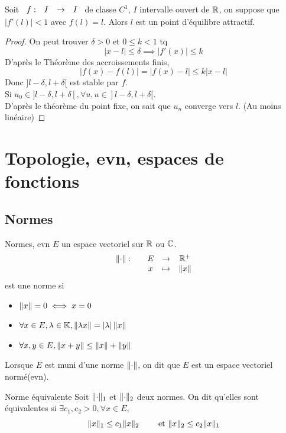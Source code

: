 \documentclass[]{report}
\begin{document}
\begin{prop}{}{}
    Soit $\begin{array}{ccccc} f : & I & \to & I \end{array}$ de classe $C^1$, $I$ intervalle ouvert de $\mathbb{R}$, on suppose que $\left|f'(l)\right|<1$ avec $f(l)=l$. Alors $l$ est un point d'équilibre attractif.
\end{prop}

\begin{proof}{}{}
    On peut trouver $\delta>0$ et $0\le k<1$ tq
    \[|x-l|\le \delta \implies \left|f'(x)\right|\le k\]
    D'après le Théorème des accroissements finis,
    \[\left|f(x)-f(l)\right|=\left|f(x)-l\right|\le k\left|x-l\right|\]
    Donc $]l-\delta,l+\delta[$ est stable par $f$.\\
    Si $u_0\in ]l-\delta,l+\delta[,\forall u,u\in ]l-\delta,l+\delta[$.\\
    D'après le théorème du point fixe, on sait que $u_n$ converge vers $l$. (Au moins linéaire)
\end{proof}

\chapter{Topologie, evn, espaces de fonctions}

\section{Normes}

\begin{df}{Normes, evn}{}
    $E$ un espace vectoriel sur $\mathbb{R}$ ou $\mathbb{C}$.
    \[\begin{array}{ccccc} \lVert \cdot \rVert : & & E & \to & \mathbb{R}^+ \\ & & x & \mapsto & \lVert x \rVert \end{array}\]
    est une norme si
    \begin{itemize}
        \item $\lVert x \rVert=0\iff x=0$
        \item $\forall x\in E, \lambda\in \mathbb{K},\lVert \lambda x \rVert=\left|\lambda\right|\lVert x \rVert$
        \item $\forall x,y\in E,\lVert x+y \rVert\le \lVert x \rVert+\lVert y \rVert$
    \end{itemize}
    Lorsque $E$ est muni d'une norme $\lVert \cdot \rVert$, on dit que $E$ est un espace vectoriel normé(evn).
\end{df}

\begin{df}{Norme équivalente}{}
    Soit $\lVert \cdot \rVert_{1}$ et $\lVert \cdot \rVert_{2}$ deux normes. On dit qu'elles sont équivalentes si $\exists c_1,c_2>0,\forall x\in E$,
    \[\lVert x \rVert_{1} \le c_1 \lVert x \rVert_{2}\qquad \text{ et } \lVert x \rVert_{2} \le c_2 \lVert x \rVert_{1}\]
\end{df}
\end{document}
